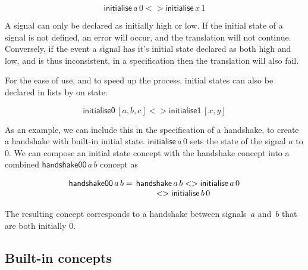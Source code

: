 \documentclass[british,conference,compsoc]{IEEEtran}
\begin{document}
\[
\mathsf{initialise}\,a\,0 <> \mathsf{initialise}\,x\, 1
\]

\vspace{-1mm}

\noindent A signal can only be declared as initially high or low. If the 
initial state of a signal is not defined, an error will occur, and the 
translation will not continue. Conversely, if the event a signal has it's 
initial state declared as both high and low, and is thus inconsistent, in a 
specification then the translation will also fail.

For the ease of use, and to speed up the process, initial states can also be 
declared in lists by on state:

\vspace{-2mm}

\[
\mathsf{initialise0}\, [a, b, c] <> \mathsf{initialise1}\, [x, y]
\]

\vspace{-1mm}

\noindent As an example, we can include this in the specification of a 
handshake, to create a handshake with built-in initial state.
$\mathsf{initialise}\,a\, 0$ sets the state of the signal
$a$ to $0$. We can compose an initial state concept with the handshake concept
into a combined $\mathsf{handshake00}\,a\, b$ concept as

\vspace{-3mm}

\[
\begin{array}{lcl}
\mathsf{handshake00}\, a\, b =&\hspace{-2mm}\mathsf{handshake}\,a\, b 
	<> \mathsf{initialise}\,a\, 0 \\
&\hspace{-6mm}<> \mathsf{initialise}\,b\, 0
\end{array}
\]

\vspace{-1mm}

The resulting concept corresponds to a handshake between signals~$a$
and~$b$ that are both initially $0$.

\vspace{-2mm}

\subsection{Built-in concepts \label{sub:built-in}}

\vspace{-3mm}
\end{document}
